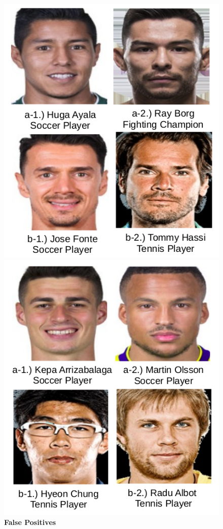 \documentclass[12pt,english]{article}
\begin{document}
\begin{figure}[H]
  \centering
  \begin{minipage}[b]{0.4\textwidth}
    \includegraphics[width=\textwidth]{figures/soccer_fp.png}
    \caption{\textbf{False Positives}}
    \label{fig:ex1fp}
  \end{minipage}
  \hfill
  \begin{minipage}[b]{0.4\textwidth}
    \includegraphics[width=\textwidth]{figures/soccer_fn.png}

\end{minipage}
\end{figure}
\end{document}
